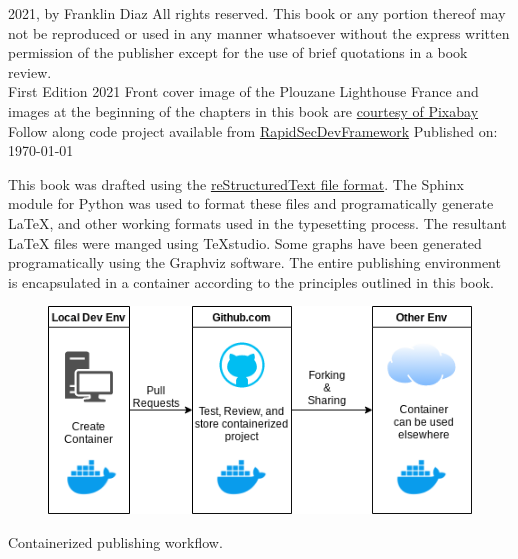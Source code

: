 \justify
\textcopyright{} 2021, by Franklin Diaz
\justify
All rights reserved. This book or any portion thereof
may not be reproduced or used in any manner whatsoever
without the express written permission of the publisher
except for the use of brief quotations in a book review.
\vspace{5mm}\\
First Edition 2021
\justify
Front cover image of the Plouzane Lighthouse France and images at the beginning of the chapters in this book are  \href{https://pixabay.com/service/terms/#license}{courtesy of Pixabay}
\justify
Follow along code project available from {\href{https://github.com/hotpeppersec/rapid_secdev_framework}{RapidSecDevFramework}}
\vspace{3mm}
Published on: \today

\justify
This book was drafted using the {\href{https://en.wikipedia.org/wiki/ReStructuredTex}{reStructuredText file format}}. 
The Sphinx module for Python was used to format these files and programatically generate LaTeX, and other working formats used in the typesetting process. The resultant LaTeX files were manged using TeXstudio. Some graphs have
been generated programatically using the Graphviz software. The entire publishing environment is encapsulated in a container according to the principles outlined in this book.

\vspace{5mm}
    \centering
\vspace{0mm}
\begin{figure}[!htb]
	\centering
	\includegraphics[scale=0.75]{../images/workflow.png}
\end{figure}
\vspace{2mm}
Containerized publishing workflow.
